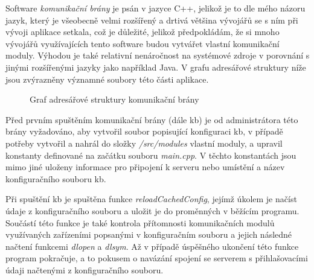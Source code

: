 Software \emph{komunikační brány} je psán v jazyce C++, jelikož je to dle mého názoru jazyk, který je všeobecně velmi rozšířený a drtivá většina vývojářů se s ním při vývoji aplikace setkala, což je důležité, jelikož předpokládám, že si mnoho vývojářů využívajících tento software budou vytvářet vlastní komunikační moduly. Výhodou je také relativní nenáročnost na systémové zdroje v porovnání s jinými rozšířenými jazyky jako například Java. V grafu adresářové struktury níže jsou zvýrazněny významné soubory této části aplikace.

\begin{figure}[h!]
    \caption{Graf adresářové struktury komunikační brány}
    \label{fig:my_label}
\end{figure}

Před prvním spuštěním komunikační brány (dále \acrshort{kb}) je od administrátora této brány vyžadováno, aby vytvořil soubor popisující konfiguraci \acrshort{kb}, v případě potřeby vytvořil a nahrál do složky \emph{/src/modules} vlastní moduly, a upravil konstanty definované na začátku souboru \emph{main.cpp}. V těchto konstantách jsou mimo jiné uloženy informace pro připojení k serveru nebo umístění a název konfiguračního souboru \acrshort{kb}.

Při spuštění \acrshort{kb} je spuštěna funkce \emph{reloadCachedConfig}, jejímž úkolem je načíst údaje z konfiguračního souboru a uložit je do proměnných 
v běžícím programu. Součástí této funkce je také kontrola přítomnosti komunikačních modulů využívaných zařízeními popsanými v konfiguračním souboru a jejich následné načtení funkcemi \emph{dlopen} a \emph{dlsym}. Až v případě úspěšného ukončení této funkce program pokračuje, a to pokusem o navázání spojení se serverem s přihlašovacími údaji načtenými z konfiguračního souboru. 

